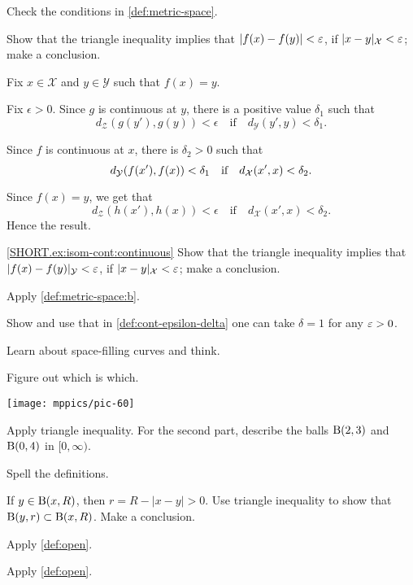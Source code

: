 \begin{multicols}{2}
Check the conditions in \ref{def:metric-space}.

Show that the triangle inequality implies that
$|f(x)-f(y)|<\varepsilon$,
if
$|x-y|_{\mathcal{X}}<\varepsilon$;
make a conclusion.

Fix $x\in \mathcal{X}$ and $y\in\mathcal{Y}$
such that $f(x)=y$.

Fix $\epsilon>0$.
Since $g$ is continuous at $y$, there is a positive value $\delta_1$ such that 
$$d_{\mathcal{Z}}(g(y'),g(y))<\epsilon
\quad
\text{if}
\quad
d_{\mathcal{Y}}(y',y)<\delta_1.$$ 

Since $f$ is continuous at $x$, there is $\delta_2>0$ such that 
$$d_{\mathcal{Y}}(f(x'),f(x))\z<\delta_1
\quad
\text{if}
\quad
d_{\mathcal{X}}(x',x)<\delta_2.$$ 

Since $f(x)=y$, we get that
$$d_{\mathcal{Z}}(h(x'),h(x))<\epsilon
\quad
\text{if}
\quad
d_{\mathcal{X}}(x',x)<\delta_2.$$ 
Hence the result.

 \ref{SHORT.ex:isom-cont:continuous}
Show that the triangle inequality implies that
$|f(x)-f(y)|_{\mathcal{Y}}<\varepsilon$,
if
$|x-y|_{\mathcal{X}}<\varepsilon$;
make a conclusion.

Apply \ref{def:metric-space:b}.

 Show and use that in \ref{def:cont-epsilon-delta} one can take $\delta=1$ for any $\varepsilon>0$.

Learn about space-filling curves and think.

Figure out which is which.

\begin{Figure}
\vskip-0mm
\centering
\texttt{[image: mppics/pic-60]}
\vskip-0mm
\end{Figure}

Apply triangle inequality.
For the second part, describe the balls $\mathrm{B}(2,3)$ and $\mathrm{B}(0,4)$ in $[0,\infty)$.

Spell the definitions.

If $y\in \mathrm{B}(x,R)$, then $r=R-|x-y|>0$.
Use triangle inequality to show that $\Ball(y,r)\z\subset \Ball(x,R)$.
Make a conclusion.

 Apply \ref{def:open}.

 Apply \ref{def:open}.


\end{multicols}
